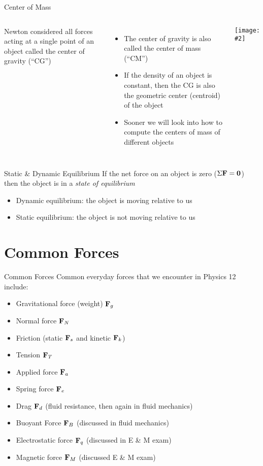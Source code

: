 \documentclass[12pt,compress,aspectratio=169]{beamer}
\newcommand{\pic}[2]{\texttt{[image: \#2]}}
\newcommand{\mb}[1]{\ensuremath\mathbf{#1}}
\begin{document}
\begin{frame}{Center of Mass}
  \begin{columns}
    Newton considered all forces acting at a single point of an object called
    the center of gravity (``CG'')
    \begin{itemize}
    \item The center of gravity is also called the center of mass (``CM'')
    \item If the density of an object is constant, then the CG is also the
      geometric center (centroid) of the object
    \item Sooner we will look into how to compute the centers of mass of
      different objects
    \end{itemize}

    \pic{1}{graphics/cofm.png}
  \end{columns}
\end{frame}

\begin{frame}{Static \& Dynamic Equilibrium}
  If the net force on an object is zero ($\Sigma\mb{F}=\mb{0}$) then the
  object is in a \emph{state of equilibrium}
  \begin{itemize}
  \item Dynamic equilibrium: the object is moving relative to us
  \item Static equilibrium: the object is not moving relative to us
  \end{itemize}
\end{frame}


\section{Common Forces}

\begin{frame}{Common Forces}
  Common everyday forces that we encounter in Physics 12 include:
  \begin{itemize}
  \item Gravitational force (weight) $\mb{F}_g$
  \item Normal force $\mb{F}_N$
  \item Friction (static $\mb{F}_s$ and kinetic $\mb{F}_k$)
  \item Tension $\mb{F}_T$
  \item Applied force $\mb{F}_a$
  \item Spring force $\mb{F}_e$
  \item Drag $\mb{F}_d$ (fluid resistance, then again in fluid mechanics)
  \item Buoyant Force $\mb{F}_B$ (discussed in fluid mechanics)
  \item Electrostatic force $\mb{F}_q$ (discussed in E \& M exam)
  \item Magnetic force $\mb{F}_M$ (discussed E \& M exam)
  \end{itemize}
\end{frame}
\end{document}
